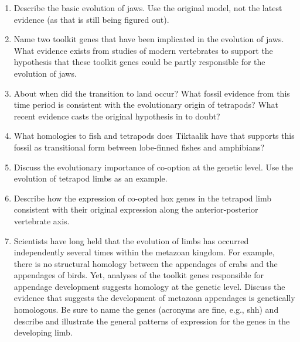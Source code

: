 \documentclass[letterpaper]{tufte-handout}
\begin{document}
\begin{enumerate}
	\item Describe the basic evolution of jaws.  Use the original model, not the latest evidence (as that is still being figured out).

	\item Name two toolkit genes that have been implicated in the evolution of jaws.  What evidence exists from studies of modern vertebrates to support the hypothesis that these toolkit genes could be partly responsible for the evolution of jaws.

	\item About when did the transition to land occur?  What fossil evidence from this time period is consistent with the evolutionary origin of tetrapods?  What recent evidence casts the original hypothesis in to doubt?

	\item What homologies to fish and tetrapods does Tiktaalik have that supports this fossil as transitional form between lobe-finned fishes and amphibians?

	\item Discuss the evolutionary importance of co-option at the genetic level.  Use the evolution of tetrapod limbs as an example. 

	\item Describe how the expression of co-opted hox genes in the tetrapod limb consistent with their original expression along the anterior-posterior vertebrate axis.

	\item Scientists have long held that the evolution of limbs has occurred independently several times within the metazoan kingdom.  For example, there is no structural homology between the appendages of crabs and the appendages of birds. Yet, analyses of the toolkit genes responsible for appendage development suggests homology at the genetic level.  Discuss the evidence that suggests the development of metazoan appendages is genetically homologous.  Be sure to name the genes (acronyms are fine, e.g., shh) and describe and illustrate the general patterns of expression for the genes in the developing limb.
\end{enumerate}
\end{document}
